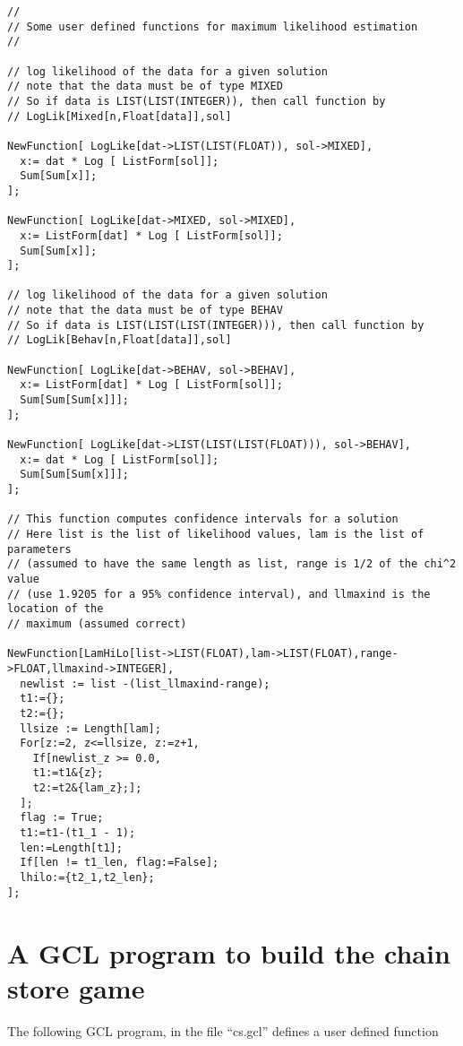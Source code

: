 {\scriptsize
\begin{verbatim}
//
// Some user defined functions for maximum likelihood estimation
// 

// log likelihood of the data for a given solution
// note that the data must be of type MIXED
// So if data is LIST(LIST(INTEGER)), then call function by  
// LogLik[Mixed[n,Float[data]],sol]

NewFunction[ LogLike[dat->LIST(LIST(FLOAT)), sol->MIXED], 
  x:= dat * Log [ ListForm[sol]];
  Sum[Sum[x]];
];

NewFunction[ LogLike[dat->MIXED, sol->MIXED], 
  x:= ListForm[dat] * Log [ ListForm[sol]];
  Sum[Sum[x]];
];

// log likelihood of the data for a given solution
// note that the data must be of type BEHAV
// So if data is LIST(LIST(LIST(INTEGER))), then call function by  
// LogLik[Behav[n,Float[data]],sol]

NewFunction[ LogLike[dat->BEHAV, sol->BEHAV], 
  x:= ListForm[dat] * Log [ ListForm[sol]];
  Sum[Sum[Sum[x]]];
];

NewFunction[ LogLike[dat->LIST(LIST(LIST(FLOAT))), sol->BEHAV], 
  x:= dat * Log [ ListForm[sol]];
  Sum[Sum[Sum[x]]];
];

// This function computes confidence intervals for a solution
// Here list is the list of likelihood values, lam is the list of parameters
// (assumed to have the same length as list, range is 1/2 of the chi^2 value
// (use 1.9205 for a 95% confidence interval), and llmaxind is the location of the 
// maximum (assumed correct) 

NewFunction[LamHiLo[list->LIST(FLOAT),lam->LIST(FLOAT),range->FLOAT,llmaxind->INTEGER],
  newlist := list -(list_llmaxind-range);
  t1:={};
  t2:={};
  llsize := Length[lam];
  For[z:=2, z<=llsize, z:=z+1,
    If[newlist_z >= 0.0, 
    t1:=t1&{z}; 
    t2:=t2&{lam_z};];
  ];
  flag := True;
  t1:=t1-(t1_1 - 1);
  len:=Length[t1];
  If[len != t1_len, flag:=False];
  lhilo:={t2_1,t2_len};
];
\end{verbatim}
}






\newpage
\section{A GCL program to build the chain store game}

The following GCL program, in the file ``cs.gcl'' defines a user
defined function

